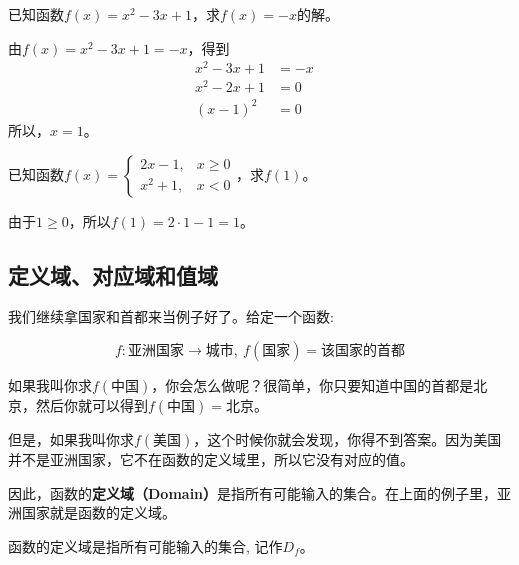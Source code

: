 \documentclass[UTF8]{ctexart}
\makeatletter
\newenvironment{cequation}{
    \makeatletter
    \setbool{@fleqn}{false}
    \makeatother
    \begin{equation*}
        }{\end{equation*}}
\makeatother
\begin{document}
\begin{question}
    已知函数$f(x) = x^2 - 3x + 1$，求$f(x) = -x$的解。
\end{question}

\begin{solution}
    由$f(x) = x^2 - 3x + 1 = -x$，得到
    \begin{align*}
        x^2 - 3x + 1 &= -x &\\
        x^2 - 2x + 1 &= 0\\
        (x - 1)^2 &= 0
    \end{align*}
    所以，$x = 1$。
\end{solution}

\begin{question}
    已知函数$f(x) = \begin{cases}
        2x - 1, & x \geq 0\\
        x^2 + 1, & x < 0
    \end{cases}$，求$f(1)$。
\end{question}

\begin{solution}
    由于$1 \geq 0$，所以$f(1) = 2 \cdot 1 - 1 = 1$。
\end{solution}


\subsection{定义域、对应域和值域} 

我们继续拿国家和首都来当例子好了。给定一个函数:

\vspace{-0.5cm}
\begin{cequation}
    f: \text{亚洲国家} \to \text{城市},\ f(\text{国家}) = \text{该国家的首都}
\end{cequation}

如果我叫你求$f(\text{中国})$，你会怎么做呢？很简单，你只要知道中国的首都是北京，然后你就可以得到$f(\text{中国}) = \text{北京}$。

但是，如果我叫你求$f(\text{美国})$，这个时候你就会发现，你得不到答案。因为美国并不是亚洲国家，它不在函数的定义域里，所以它没有对应的值。

因此，函数的\textbf{定义域（Domain）}是指所有可能输入的集合。在上面的例子里，亚洲国家就是函数的定义域。

\begin{info}[定义域]
    函数的定义域是指所有可能输入的集合, 记作$D_f$。
\end{info}
\end{document}
